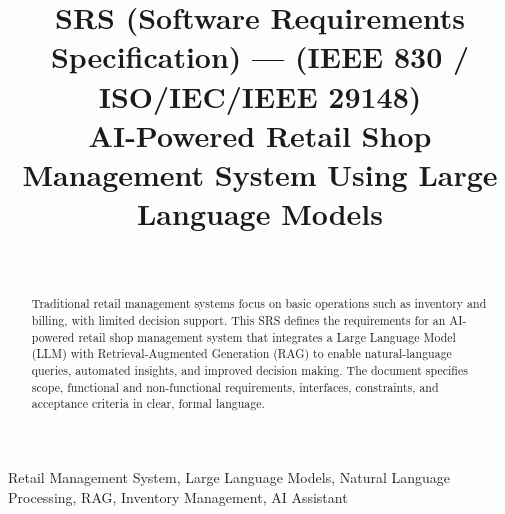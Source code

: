 \documentclass[onecolumn]{IEEEtran}
\title{SRS (Software Requirements Specification) --- (IEEE 830 / ISO/IEC/IEEE 29148)\\AI-Powered Retail Shop Management System Using Large Language Models}
\author{\IEEEauthorblockN{Student Name}\\\IEEEauthorblockA{Department, Institution\\City, Country\\email@example.com}}
\date{}
\begin{document}
\maketitle

\begin{abstract}
Traditional retail management systems focus on basic operations such as inventory and billing, with limited decision support. This SRS defines the requirements for an AI-powered retail shop management system that integrates a Large Language Model (LLM) with Retrieval-Augmented Generation (RAG) to enable natural-language queries, automated insights, and improved decision making. The document specifies scope, functional and non-functional requirements, interfaces, constraints, and acceptance criteria in clear, formal language.
\end{abstract}

\begin{IEEEkeywords}
Retail Management System, Large Language Models, Natural Language Processing, RAG, Inventory Management, AI Assistant
\end{IEEEkeywords}










\end{document}
